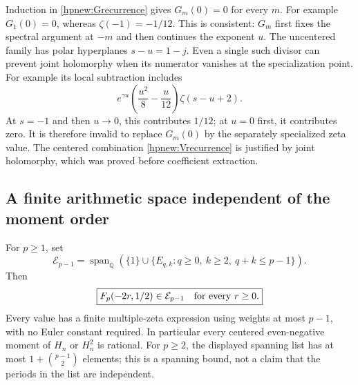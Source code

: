 \begin{remark}
\label{hpnew:orderwarning}
Induction in \eqref{hpnew:Grecurrence} gives $G_m(0)=0$ for every
$m$. For example $G_1(0)=0$, whereas $\zeta(-1)=-1/12$.
This is consistent: $G_m$ first fixes the spectral argument at $-m$
and then continues the exponent $u$. The uncentered family has polar hyperplanes $s-u=1-j$.
Even a single such divisor can prevent joint holomorphy when its
numerator vanishes at the specialization point. For example its
local subtraction includes
\[
 e^{\gamma u}\left(\frac{u^2}{8}-\frac{u}{12}\right)
                                      \zeta(s-u+2).
\]
At $s=-1$ and then $u\to0$, this contributes $1/12$; at $u=0$
first, it contributes zero. It is therefore invalid to replace
$G_m(0)$ by the separately specialized zeta value.
The centered combination \eqref{hpnew:Vrecurrence} is justified by
joint holomorphy, which was proved before coefficient extraction.
\end{remark}

\subsection{A finite arithmetic space independent of the moment order}

\begin{theorem}
\label{hpnew:uniformspan}
For $p\ge1$, set
\begin{equation}\label{hpnew:space}
 \mathcal E_{p-1}=\operatorname{span}_{\mathbb Q}
 \left(\{1\}\cup
   \{E_{q,k}:q\ge0,\ k\ge2,\ q+k\le p-1\}\right).
\end{equation}
Then
\begin{equation}\label{hpnew:spanconclusion}
 \boxed{\displaystyle
             F_p(-2r,1/2)\in\mathcal E_{p-1}
                    \quad\hbox{for every }r\ge0.}
\end{equation}
Every value has a finite multiple-zeta expression using weights at
most $p-1$, with no Euler constant required. In particular every
centered even-negative moment of $H_n$ or $H_n^2$ is rational.
For $p\ge2$, the displayed spanning list has at most
$1+\binom{p-1}{2}$ elements; this is a spanning bound, not a claim
that the periods in the list are independent.
\end{theorem}

